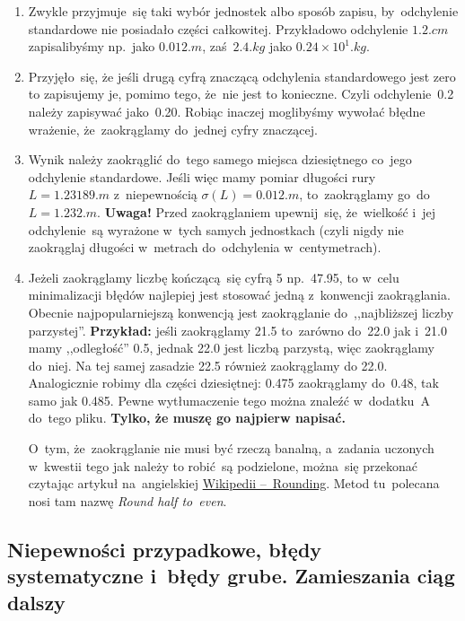 \documentclass[a4paper,11pt]{article}
\newcommand{\tb}{\textbf}
\begin{document}
\begin{enumerate}
\begin{figure}[h]
    \label{fig:odchylenie}
  \end{figure}
\item Zwykle przyjmuje~się taki wybór jednostek albo sposób zapisu,
  by~odchylenie standardowe nie posiadało części całkowitej.
  Przykładowo odchylenie $1.2 \si{.cm}$ zapisalibyśmy np.~jako
  $0.012 \si{.m}$, zaś~$2.4 \si{.kg}$ jako
  $0.24 \times 10^{ 1 } \si{.kg}$.
\item Przyjęło~się, że jeśli drugą cyfrą znaczącą odchylenia
  standardowego jest zero to zapisujemy je, pomimo tego, że~nie jest
  to konieczne. Czyli odchylenie~0.2 należy zapisywać jako~0.20.
  Robiąc inaczej moglibyśmy wywołać błędne wrażenie, że~zaokrąglamy
  do~jednej cyfry znaczącej.
\item Wynik należy zaokrąglić do~tego samego miejsca dziesiętnego
  co~jego odchylenie standardowe. Jeśli więc mamy pomiar długości rury
  $L = 1.23189 \si{.m}$ z~niepewnością $\sigma( L ) = 0.012 \si{.m}$,
  to~zaokrąglamy go~do~$L = 1.232 \si{.m}$. \tb{Uwaga!} Przed
  zaokrąglaniem upewnij~się, że~wielkość i~jej odchylenie~są wyrażone
  w~tych samych jednostkach (czyli nigdy nie zaokrąglaj długości
  w~metrach do~odchylenia w~centymetrach).
\item Jeżeli zaokrąglamy liczbę kończącą~się cyfrą 5 np.~47.95, to
  w~celu minimalizacji błędów najlepiej jest stosować jedną
  z~konwencji zaokrąglania. Obecnie najpopularniejszą konwencją jest
  zaokrąglanie do~,,najbliższej liczby parzystej''. \tb{Przykład:}
  jeśli zaokrąglamy 21.5 to~zarówno do~22.0 jak i~21.0 mamy
  ,,odległość'' 0.5, jednak 22.0 jest liczbą parzystą, więc
  zaokrąglamy do~niej. Na tej samej zasadzie 22.5 również zaokrąglamy
  do 22.0. Analogicznie robimy dla części dziesiętnej: 0.475
  zaokrąglamy do~0.48, tak samo jak 0.485. Pewne wytłumaczenie tego
  można znaleźć w~dodatku~A do~tego pliku. \tb{Tylko, że muszę go
    najpierw napisać.}

  O~tym, że~zaokrąglanie nie musi być rzeczą banalną, a~zadania
  uczonych w~kwestii tego jak należy to robić~są podzielone, można~się
  przekonać czytając artykuł na~angielskiej
  \href{https://en.wikipedia.org/wiki/Rounding}{Wikipedii
    --~Rounding}. Metod tu~polecana nosi tam nazwę \emph{Round half
    to~even}.
\end{enumerate}





\subsection{Niepewności przypadkowe, błędy systematyczne i~błędy
  grube. Zamieszania ciąg dalszy}
\label{sec:niepewnosci}
\end{document}
